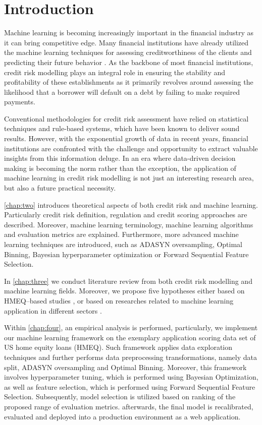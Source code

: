 \chapter{Introduction}
\label{chap:one}


Machine learning is becoming increasingly important in the financial industry as it can bring competitive edge. Many financial institutions have already utilized the machine learning techniques for assessing creditworthiness of the clients and predicting their future behavior \citep{PwC2023}.
As the backbone of most financial institutions, credit risk modelling plays an integral role in ensuring the stability and profitability of these establishments as it primarily revolves around assessing the likelihood that a borrower will default on a debt by failing to make required payments.

Conventional methodologies for credit risk assessment have relied on statistical techniques and rule-based systems, which have been known to deliver sound results.
However, with the exponential growth of data in recent years, financial institutions are confronted with the challenge and opportunity to extract valuable insights from this information deluge.
In an era where data-driven decision making is becoming the norm rather than the exception, the application of machine learning in credit risk modelling is not just an interesting research area, but also a future practical necessity.


\autoref{chap:two} introduces theoretical aspects of both credit risk  and machine learning. Particularly credit risk definition, regulation and credit scoring approaches are described. Moreover, machine learning terminology, machine learning algorithms and evaluation metrics are explained. Furthermore, more advanced machine learning techniques are introduced, such as ADASYN oversampling, Optimal Binning, Bayesian hyperparameter optimization or Forward Sequential Feature Selection.

In \autoref{chap:three} we conduct literature review from both credit risk modelling and machine learning fields. Moreover, we propose five hypotheses either based on HMEQ--based studies \citep{serkan2021bagging, zurada2014classification}, or based on researches related to machine learning application in different sectors \citep{de2023predicting, pintelas2020grey, wu2018accurate}.

Within \autoref{chap:four}, an empirical analysis is performed, particularly, we implement our machine learning framework on the exemplary application scoring data set of US home equity loans (HMEQ).
Such framework applies data exploration techniques and further performs data preprocessing transformations, namely data split, ADASYN oversampling and Optimal Binning.
Moreover, this framework involves hyperparameter tuning, which is performed using Bayesian Optimization, as well as feature selection, which is performed using Forward Sequential Feature Selection.
Subsequently, model selection is utilized based on ranking of the proposed range of evaluation metrics.
afterwards, the final model is recalibrated, evaluated and deployed into a production environment as a web application.

